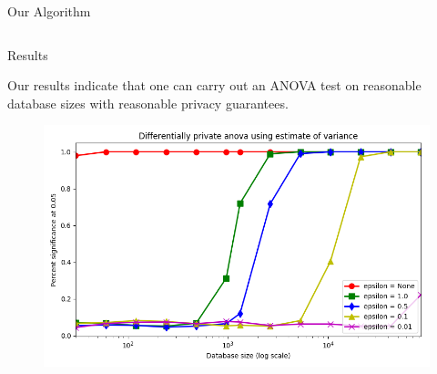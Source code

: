 \documentclass[final]{beamer}
\newlength{\onecolwid}
\newlength{\twocolwid}
\begin{document}
\begin{frame}[t]
\begin{columns}[t]
\begin{column}{\twocolwid}
\begin{columns}[t,totalwidth=\twocolwid]
\begin{column}{\onecolwid}
\begin{block}{Our Algorithm}
\end{block}


\end{column} %

\end{columns} %







\vspace{-.5in}
\begin{block}{Results}

Our results indicate that one can carry out an ANOVA test on reasonable database sizes with 
reasonable privacy guarantees. 

\begin{center}
\begin{figure}
\includegraphics[width=.81\linewidth]{varest1000_1.png}
\end{figure}
\end{center}


\end{block}
\end{column}
\end{columns}
\end{frame}
\end{document}
